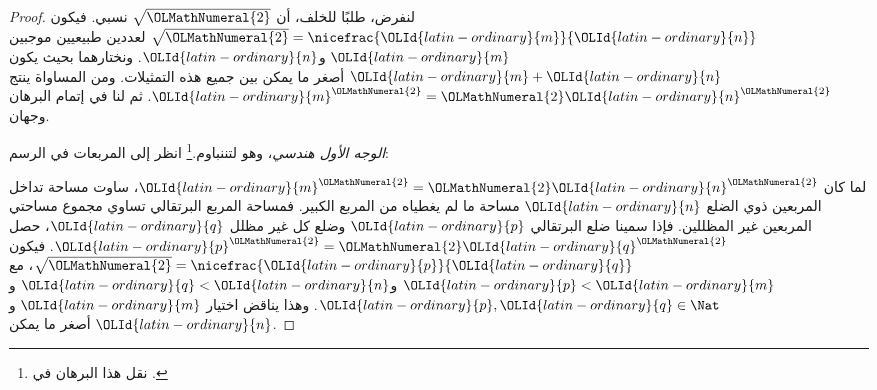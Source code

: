 \documentclass[../../../include/open-logic-section]{subfiles}
\begin{document}
\begin{proof}
لنفرض، طلبًا للخلف، أن $\sqrt{{\OLMathNumeral{2}}}$ نسبي. فيكون $\sqrt{{\OLMathNumeral{2}}} =
\nicefrac{{\OLId{latin-ordinary}{m}}}{{\OLId{latin-ordinary}{n}}}$ لعددين طبيعيين موجبين ${\OLId{latin-ordinary}{m}}$ و${\OLId{latin-ordinary}{n}}$. ونختارهما بحيث يكون
${\OLId{latin-ordinary}{m}}+{\OLId{latin-ordinary}{n}}$ أصغر ما يمكن بين جميع هذه التمثيلات. ومن المساواة ينتج
${\OLId{latin-ordinary}{m}}^{{\OLMathNumeral{2}}} = {\OLMathNumeral{2}}{\OLId{latin-ordinary}{n}}^{{\OLMathNumeral{2}}}$. ثم لنا في إتمام البرهان وجهان.

\emph{الوجه الأول هندسي}، وهو لتننباوم.\footnote{نقل هذا البرهان في \cite{Conway2006}.} انظر إلى المربعات في الرسم:
\begin{center}
\end{center}
لما كان ${\OLId{latin-ordinary}{m}}^{\OLMathNumeral{2}} = {\OLMathNumeral{2}}{\OLId{latin-ordinary}{n}}^{\OLMathNumeral{2}}$، ساوت مساحة تداخل المربعين ذوي الضلع ${\OLId{latin-ordinary}{n}}$ مساحة ما لم يغطياه من المربع الكبير. فمساحة المربع البرتقالي تساوي مجموع مساحتي المربعين غير المظللين. فإذا سمينا ضلع البرتقالي ${\OLId{latin-ordinary}{p}}$ وضلع كل غير مظلل ${\OLId{latin-ordinary}{q}}$، حصل ${\OLId{latin-ordinary}{p}}^{\OLMathNumeral{2}} = {\OLMathNumeral{2}}{\OLId{latin-ordinary}{q}}^{\OLMathNumeral{2}}$. فيكون $\sqrt{{\OLMathNumeral{2}}} = \nicefrac{{\OLId{latin-ordinary}{p}}}{{\OLId{latin-ordinary}{q}}}$، مع ${\OLId{latin-ordinary}{p}} < {\OLId{latin-ordinary}{m}}$ و${\OLId{latin-ordinary}{q}} < {\OLId{latin-ordinary}{n}}$ و${\OLId{latin-ordinary}{p}}, {\OLId{latin-ordinary}{q}} \in
\Nat$. وهذا يناقض اختيار ${\OLId{latin-ordinary}{m}}$ و${\OLId{latin-ordinary}{n}}$ أصغر ما يمكن.


\end{proof}
\end{document}
